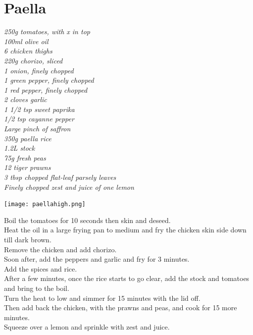 \documentclass{tufte-book}
\begin{document}
\section{Paella}

\emph{250g tomatoes, with x in top
\\100ml olive oil
\\6 chicken thighs
\\220g chorizo, sliced
\\1 onion, finely chopped
\\1 green pepper, finely chopped
\\1 red pepper, finely chopped
\\2 cloves garlic
\\1 1/2 tsp sweet paprika
\\1/2 tsp cayanne pepper
\\Large pinch of saffron
\\350g paella rice
\\1.2L stock
\\75g fresh peas
\\12 tiger prawns
\\3 tbsp chopped flat-leaf parsely leaves
\\Finely chopped zest and juice of one lemon
}

\begin{marginfigure}%
  \texttt{[image: paellahigh.png]}
\end{marginfigure}

Boil the tomatoes for 10 seconds then skin and deseed.
\\Heat the oil in a large frying pan to medium and fry the chicken skin side down till dark brown.
\\Remove the chicken and add chorizo.
\\Soon after, add the peppers and garlic and fry for 3 minutes.
\\Add the spices and rice.
\\After a few minutes, once the rice starts to go clear, add the stock and tomatoes and bring to the boil.
\\Turn the heat to low and simmer for 15 minutes with the lid off.
\\Then add back the chicken, with the prawns and peas, and cook for 15 more minutes.
\\Squeeze over a lemon and sprinkle with zest and juice.
\end{document}
